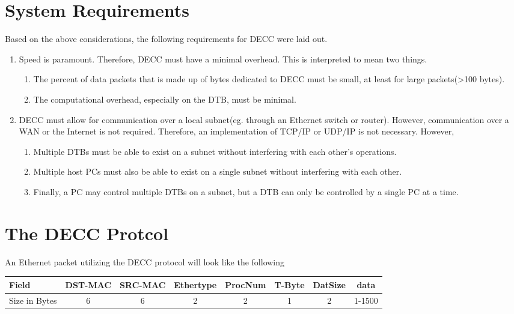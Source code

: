 \documentclass{article}
\begin{document}
\section{System Requirements}
Based on the above considerations, the following requirements for DECC were laid
out.
\begin{enumerate}
  \item Speed is paramount. Therefore, DECC must have a minimal overhead. This
  is interpreted to mean two things.
  \begin{enumerate}
    \item The percent of data packets that is made up of bytes dedicated to DECC
    must be small, at least for large packets(\textgreater100 bytes).
    \item The computational overhead, especially on the DTB, must be minimal.
  \end{enumerate}
  \item DECC must allow for communication over a local subnet(eg. through an
  Ethernet switch or router). However, communication over a WAN or the Internet
  is not required. Therefore, an implementation of TCP/IP or UDP/IP is not
  necessary. However,
  \begin{enumerate}
    \item Multiple DTBs must be able to exist on a subnet without interfering
    with each other's operations.
    \item Multiple host PCs must also be able to exist on a single subnet
    without interfering with each other.
    \item Finally, a PC may control multiple DTBs on a subnet, but a DTB can
    only be controlled by a single PC at a time.
  \end{enumerate}
\end{enumerate}

\section{The DECC Protcol}
An Ethernet packet utilizing the DECC protocol will look like the following
\begin{table}[h]
\centering
\begin{tabular}{|l|c|c|c|c|c|c|c|}\hline
Field & DST-MAC & SRC-MAC & Ethertype & ProcNum & T-Byte & DatSize
& data \\ \hline 
Size in Bytes & 6 & 6 & 2 & 2 & 1 & 2 & 1-1500 \\ \hline
\end{tabular}
\end{table}
\end{document}
